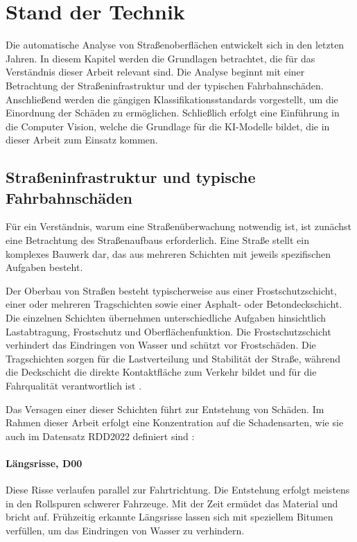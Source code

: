 \section{Stand der Technik}
\label{sec:stand_der_technik}

Die automatische Analyse von Straßenoberflächen entwickelt sich in den letzten Jahren. In diesem Kapitel werden die Grundlagen betrachtet, die für das Verständnis dieser Arbeit relevant sind. Die Analyse beginnt mit einer Betrachtung der Straßeninfrastruktur und der typischen Fahrbahnschäden. Anschließend werden die gängigen Klassifikationsstandards vorgestellt, um die Einordnung der Schäden zu ermöglichen. Schließlich erfolgt eine Einführung in die Computer Vision, welche die Grundlage für die KI-Modelle bildet, die in dieser Arbeit zum Einsatz kommen.

\subsection{Straßeninfrastruktur und typische Fahrbahnschäden}
\label{subsec:infrastruktur}

Für ein Verständnis, warum eine Straßenüberwachung notwendig ist, ist zunächst eine Betrachtung des Straßenaufbaus erforderlich. Eine Straße stellt ein komplexes Bauwerk dar, das aus mehreren Schichten mit jeweils spezifischen Aufgaben besteht.

Der Oberbau von Straßen besteht typischerweise aus einer Frostschutzschicht, einer oder mehreren Tragschichten sowie einer Asphalt- oder Betondeckschicht. Die einzelnen Schichten übernehmen unterschiedliche Aufgaben hinsichtlich Lastabtragung, Frostschutz und Oberflächenfunktion. Die Frostschutzschicht verhindert das Eindringen von Wasser und schützt vor Frostschäden. Die Tragschichten sorgen für die Lastverteilung und Stabilität der Straße, während die Deckschicht die direkte Kontaktfläche zum Verkehr bildet und für die Fahrqualität verantwortlich ist \cite{bmdv_asb_querschnitt_2024}.

Das Versagen einer dieser Schichten führt zur Entstehung von Schäden. Im Rahmen dieser Arbeit erfolgt eine Konzentration auf die Schadensarten, wie sie auch im Datensatz RDD2022 definiert sind \cite{rdd2022}:

\paragraph{Längsrisse, D00}
Diese Risse verlaufen parallel zur Fahrtrichtung. Die Entstehung erfolgt meistens in den Rollspuren schwerer Fahrzeuge. Mit der Zeit ermüdet das Material und bricht auf. Frühzeitig erkannte Längsrisse lassen sich mit speziellem Bitumen verfüllen, um das Eindringen von Wasser zu verhindern.

